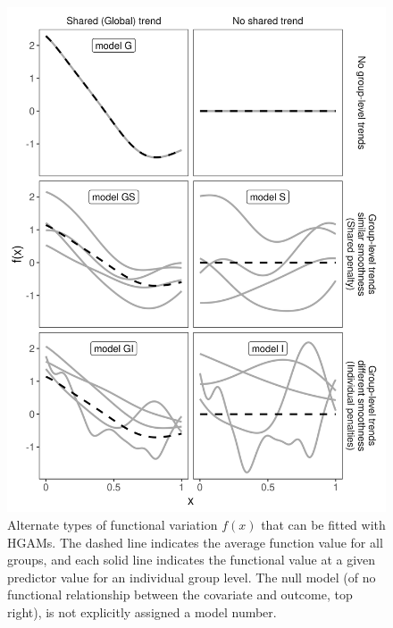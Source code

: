 \documentclass[12pt]{article}
\begin{document}
\begin{figure}
\centering
\includegraphics{../figures/alternate_models.png}
\caption{\label{fig:models}Alternate types of functional variation
\(f(x)\) that can be fitted with HGAMs. The dashed line indicates the
average function value for all groups, and each solid line indicates the
functional value at a given predictor value for an individual group
level. The null model (of no functional relationship between the
covariate and outcome, top right), is not explicitly assigned a model
number.}
\end{figure}
\end{document}
